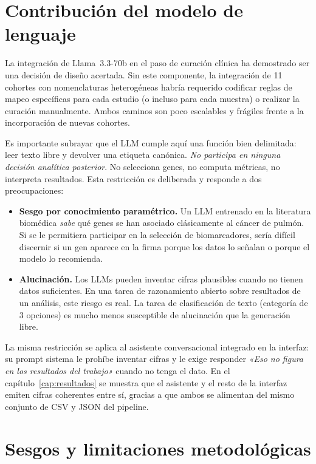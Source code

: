 \section{Contribución del modelo de lenguaje}
\label{sec:disc_llm}

La integración de Llama~3.3-70b en el paso de curación clínica ha
demostrado ser una decisión de diseño acertada. Sin este componente, la
integración de 11 cohortes con nomenclaturas heterogéneas habría requerido
codificar reglas de mapeo específicas para cada estudio (o incluso para
cada muestra) o realizar la curación manualmente. Ambos caminos son poco
escalables y frágiles frente a la incorporación de nuevas cohortes.

Es importante subrayar que el LLM cumple aquí una función bien
delimitada: leer texto libre y devolver una etiqueta canónica.
\emph{No participa en ninguna decisión analítica posterior}. No selecciona
genes, no computa métricas, no interpreta resultados. Esta restricción es
deliberada y responde a dos preocupaciones:

\begin{itemize}
  \item \textbf{Sesgo por conocimiento paramétrico.} Un LLM entrenado en
  la literatura biomédica \emph{sabe} qué genes se han asociado
  clásicamente al cáncer de pulmón. Si se le permitiera participar en la
  selección de biomarcadores, sería difícil discernir si un gen aparece
  en la firma porque los datos lo señalan o porque el modelo lo
  recomienda.
  \item \textbf{Alucinación.} Los LLMs pueden inventar cifras plausibles
  cuando no tienen datos suficientes. En una tarea de razonamiento
  abierto sobre resultados de un análisis, este riesgo es real. La tarea
  de clasificación de texto (categoría de 3 opciones) es mucho menos
  susceptible de alucinación que la generación libre.
\end{itemize}

La misma restricción se aplica al asistente conversacional integrado en
la interfaz: su prompt sistema le prohíbe inventar cifras y le exige
responder \emph{«Eso no figura en los resultados del trabajo»} cuando no
tenga el dato. En el capítulo~\ref{cap:resultados} se muestra que el
asistente y el resto de la interfaz emiten cifras coherentes entre sí,
gracias a que ambos se alimentan del mismo conjunto de CSV y JSON del
pipeline.

\section{Sesgos y limitaciones metodológicas}
\label{sec:disc_sesgos}

